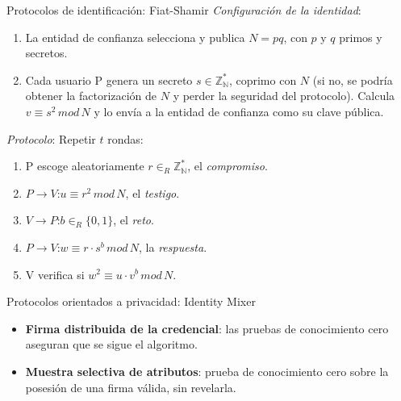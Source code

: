 \documentclass{beamer}
\begin{document}
\begin{frame}{Protocolos de identificación: Fiat-Shamir}
	\textit{Configuración de la identidad}:
	\begin{enumerate}
		\item La entidad de confianza selecciona y publica $N=pq$, con $p$ y $q$ primos y secretos.
		
		\item Cada usuario P genera un secreto $s \in \mathbb{Z_N^*}$, coprimo con $N$ (si no, se podría obtener la factorización de $N$ y perder la seguridad del protocolo). Calcula $v \equiv s^2 \, mod \, N$ y lo envía a la entidad de confianza como su clave pública.
		
	\end{enumerate}
	
	
	\textit{Protocolo}: Repetir $t$ rondas:
	\begin{enumerate}
		\item P escoge aleatoriamente $r \in_R \mathbb{Z_N^*}$, el \textit{compromiso}.
		\item $P \rightarrow V$:\quad $u \equiv r^2 \, mod \, N$, el \textit{testigo}.
		\item $V \rightarrow P$:\quad $b \in_R \{0,1\}$, el \textit{reto}.
		\item $P \rightarrow V$:\quad $w \equiv r\cdot s^b \, mod \, N$, la \textit{respuesta}.
		\item V verifica si \quad $ w^2 \equiv u\cdot v^b \, mod \, N$.
	\end{enumerate}

\end{frame}




\begin{frame}{Protocolos orientados a privacidad: Identity Mixer}	
	\begin{itemize}
		\item \textbf{Firma distribuida de la credencial}: las pruebas de conocimiento cero aseguran que se sigue el algoritmo.
		\item \textbf{Muestra selectiva de atributos}: prueba de conocimiento cero sobre la posesión de una firma válida, sin revelarla.
	\end{itemize}
\end{frame}





\maketitle
\end{document}
